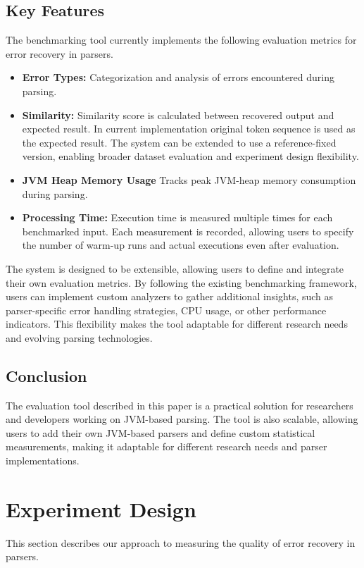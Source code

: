 \documentclass[conference]{IEEEtran}
\begin{document}
\subsection{Key Features}
The benchmarking tool currently implements the following evaluation metrics for error recovery in parsers.

\begin{itemize}
    \item \textbf{Error Types:} Categorization and analysis of errors encountered during parsing.
    \item \textbf{Similarity:} Similarity score is calculated between recovered output and expected result.  
    In current implementation original token sequence is used as the expected result.  
    The system can be extended to use a reference-fixed version, enabling broader dataset evaluation and experiment design flexibility.

   
    \item \textbf{JVM Heap Memory Usage} Tracks peak JVM-heap memory consumption during parsing.
    \item \textbf{Processing Time:} Execution time is measured multiple times for each benchmarked input. Each measurement is recorded, allowing users to specify the number of warm-up runs and actual executions even after evaluation.

\end{itemize}

The system is designed to be extensible, allowing users to define and integrate their own evaluation metrics. By following the existing benchmarking framework, users can implement custom analyzers to gather additional insights, such as parser-specific error handling strategies, CPU usage, or other performance indicators. This flexibility makes the tool adaptable for different research needs and evolving parsing technologies.


\subsection{Conclusion}
The evaluation tool described in this paper is a practical solution for researchers and developers working on JVM-based parsing. The tool is also scalable, allowing users to add their own JVM-based parsers and define custom statistical measurements, making it adaptable for different research needs and parser implementations.


\section{Experiment Design}
This section describes our approach to measuring the quality of error recovery in parsers.
\end{document}
